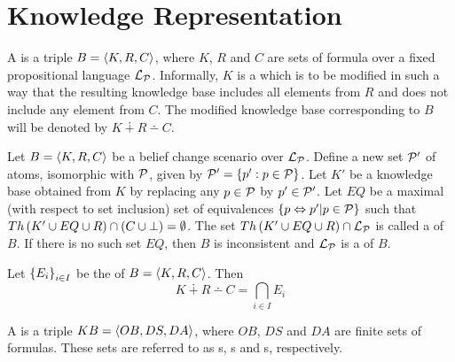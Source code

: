 \section{Knowledge Representation}

\begin{defi}
A  is a triple $B=\left\langle K,R,C\right\rangle$, where $K$, $R$ and $C$ are sets of formula over a fixed propositional language $\mathcal{L}_{\mathcal{P}}$. Informally, $K$ is a  which is to be modified in such a way that the resulting knowledge base includes all elements from $R$ and does not include any element from $C$. The modified knowledge base corresponding to $B$ will be denoted by $K\dotplus R\dotminus C$.
\cite{conf/fedcsis/KorpusikLM12}
\end{defi}

\begin{defi}
Let $B=\left\langle K,R,C\right\rangle$ be a belief change scenario over $\mathcal{L}_{\mathcal{P}}$. Define a new set $\mathcal{P}'$ of atoms, isomorphic with $\mathcal{P}$, given by $\mathcal{P}'=\left\{ p':p\in\mathcal{P}\right\}$. Let $K'$ be a knowledge base obtained from $K$ by replacing any $p\in\mathcal{P}$ by $p'\in\mathcal{P}'$. Let $EQ$ be a maximal (with respect to set inclusion) set of equivalences $\left\{ p\Leftrightarrow p'|p\in\mathcal{P}\right\}$ such that $Th\left(K'\cup EQ\cup R\right)\cap\left( C\cup\bot\right)=\emptyset$. The set $Th\left(K'\cup EQ\cup R\right)\cap\mathcal{L}_{\mathcal{P}}$ is called a  of $B$. If there is no such set $EQ$, then $B$ is inconsistent and $\mathcal{L}_{\mathcal{P}}$ is a  of $B$.
\cite{conf/fedcsis/KorpusikLM12}
\end{defi}

\begin{defi}
Let $\left\{ E_i\right\}_{i\in I}$ be the  of $B=\left\langle K,R,C\right\rangle$. Then
\begin{equation}
K\dotplus R\dotminus C=\displaystyle\bigcap_{i\in I}E_i
\end{equation}
\cite{conf/fedcsis/KorpusikLM12}
\end{defi}

\begin{defi}
A  is a triple $KB=\left\langle OB,DS,DA\right\rangle$, where $OB$, $DS$ and $DA$ are finite sets of formulas. These sets are referred to as s, s and s, respectively.
\cite{conf/fedcsis/KorpusikLM12}
\end{defi}

